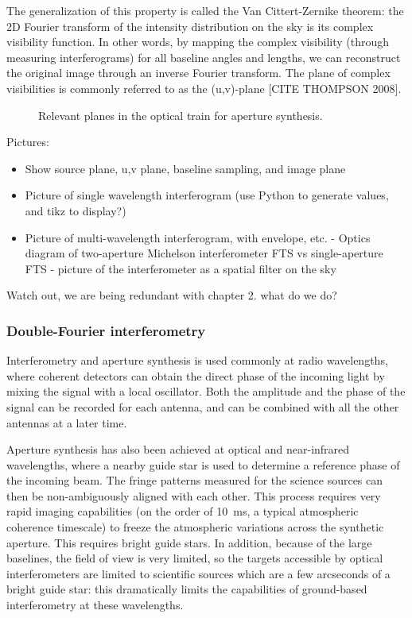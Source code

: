 The generalization of this property is called the Van Cittert-Zernike theorem: the 2D Fourier transform of the intensity distribution on the sky is its complex visibility function. In other words, by mapping the complex visibility (through measuring interferograms) for all baseline angles and lengths, we can reconstruct the original image through an inverse Fourier transform. The plane of complex visibilities is commonly referred to as the (u,v)-plane [CITE THOMPSON 2008].


\begin{figure}[!ht]
	\centering
	
	\caption[Aperture synthesis]{Relevant planes in the optical train for aperture synthesis.}
	\label{fig:aperturesynthesis}
    \end{figure}



Pictures:
\begin{itemize}
\item Show source plane, u,v plane, baseline sampling, and image plane
\item Picture of single wavelength interferogram (use Python to generate values, and tikz to display?)
\item Picture of multi-wavelength interferogram, with envelope, etc.
- Optics diagram of two-aperture Michelson interferometer FTS vs single-aperture FTS
- picture of the interferometer as a spatial filter on the sky
\end{itemize}

Watch out, we are being redundant with chapter 2. what do we do?

\subsubsection{Double-Fourier interferometry}

Interferometry and aperture synthesis is used commonly at radio wavelengths, where coherent detectors can obtain the direct phase of the incoming light by mixing the signal with a local oscillator. Both the amplitude and the phase of the signal can be recorded for each antenna, and can be combined with all the other antennas at a later time.

Aperture synthesis has also been achieved at optical and near-infrared wavelengths, where a nearby guide star is used to determine a reference phase of the incoming beam. The fringe patterns measured for the science sources can then be non-ambiguously aligned with each other. This process requires very rapid imaging capabilities (on the order of \SI{10}{\milli\second}, a typical atmospheric coherence timescale) to freeze the atmospheric variations across the synthetic aperture. This requires bright guide stars. In addition, because of the large baselines, the field of view is very limited, so the targets accessible by optical interferometers are limited to scientific sources which are a few arcseconds of a bright guide star: this dramatically limits the capabilities of ground-based interferometry at these wavelengths.

